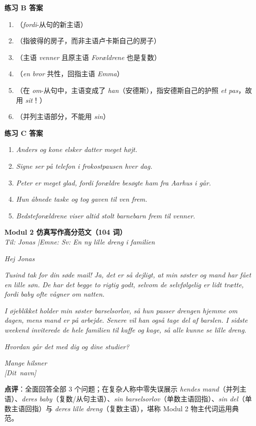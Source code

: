 \begin{answerbox}
\textbf{练习 B 答案}
\begin{enumerate}
  \item {}（\textit{fordi}-从句的新主语）
  \item {}（指彼得的房子，而非主语卢卡斯自己的房子）
  \item {}（主语 \textit{venner} 且原主语 \textit{Forældrene} 也是复数）
  \item {}（\textit{en bror} 共性，回指主语 \textit{Emma}）
  \item {}（在 \textit{om}-从句中，主语变成了 \textit{han}（安德斯），指安德斯自己的护照 \textit{et pas}，故用 \textit{sit}！）
  \item {}（并列主语部分，不能用 \textit{sin}）
\end{enumerate}

\textbf{练习 C 答案}
\begin{enumerate}
  \item \textit{Anders og  kone elsker  datter meget højt.}
  \item \textit{Signe ser på  telefon i frokostpausen hver dag.}
  \item \textit{Peter er meget glad, fordi  forældre besøgte ham fra Aarhus i går.}
  \item \textit{Hun åbnede  taske og tog gaven til  ven frem.}
  \item \textit{Bedsteforældrene viser altid stolt  barnebarn frem til  venner.}
\end{enumerate}

\textbf{Modul 2 仿真写作高分范文（104 词）}\\
\textit{Til: Jonas \quad|\quad Emne: Sv: En ny lille dreng i familien}

\textit{Hej Jonas}

\textit{Tusind tak for din søde mail! Ja, det er så dejligt, at min søster og  mand har fået en lille søn. De har det begge to rigtig godt, selvom de selvfølgelig er lidt trætte, fordi  baby ofte vågner om natten.}

\textit{I øjeblikket holder min søster  barselsorlov, så hun passer drengen hjemme om dagen, mens  mand er på arbejde. Senere vil han også tage  del af barslen. I sidste weekend inviterede de hele familien til kaffe og kage, så alle kunne se  lille dreng.}

\textit{Hvordan går det med dig og dine studier?}

\textit{Mange hilsner\\
\mbox{[Dit navn]}}

\small\textbf{点评}：全面回答全部 3 个问题；在复杂人称中零失误展示 \textit{hendes mand}（并列主语）、\textit{deres baby}（复数/从句主语）、\textit{sin barselsorlov}（单数主语回指）、\textit{sin del}（单数主语回指）与 \textit{deres lille dreng}（复数主语），堪称 Modul 2 物主代词运用典范。
\end{answerbox}
